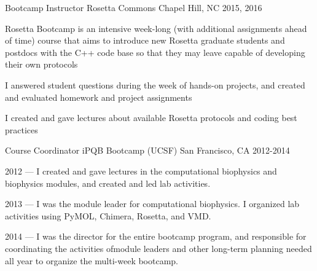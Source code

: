 

\begin{cventries}

  \cventry
  {Bootcamp Instructor} %
  {Rosetta Commons} %
  {Chapel Hill, NC} %
  {2015, 2016} %
  {
    \begin{cvitems} %
    \item Rosetta Bootcamp is an intensive week-long (with additional assignments ahead of time) course
      that aims to introduce new Rosetta graduate students and postdocs with the C++ code base so that they may leave capable
      of developing their own protocols
    \item I answered student questions during the week of hands-on projects, and created and evaluated homework and project assignments
    \item I created and gave lectures about available Rosetta protocols and coding best practices
    \end{cvitems}
  }

  \cventry
  {Course Coordinator} %
  {iPQB Bootcamp (UCSF)} %
  {San Francisco, CA} %
  {2012-2014} %
  {
    \begin{cvitems} %
    \item {2012 --- I created and gave lectures in the computational biophysics and biophysics modules, and created and led lab activities.}
    \item {2013 --- I was the module leader for computational biophysics. I organized lab activities using PyMOL, Chimera, Rosetta, and VMD.}
    \item {2014 --- I was the director for the entire bootcamp program, and responsible for coordinating the activities ofmodule leaders and other long-term planning needed all year to organize the multi-week bootcamp.}
    \end{cvitems}
  }


\end{cventries}
